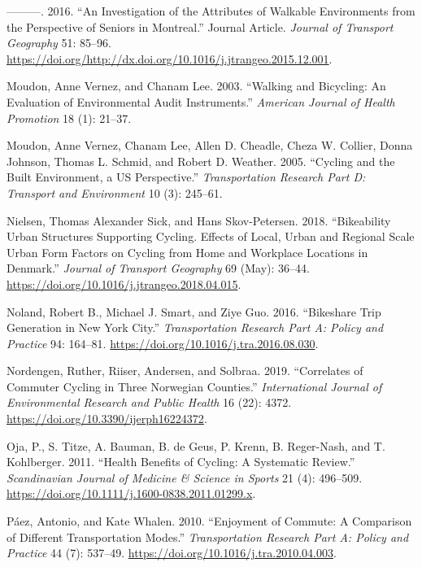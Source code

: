 \documentclass[smallextended]{svjour3}       %
\begin{document}
\leavevmode\hypertarget{ref-Moniruzzaman2016}{}%
---------. 2016. ``An Investigation of the Attributes of Walkable
Environments from the Perspective of Seniors in Montreal.'' Journal
Article. \emph{Journal of Transport Geography} 51: 85--96.
\url{https://doi.org/http://dx.doi.org/10.1016/j.jtrangeo.2015.12.001}.

\leavevmode\hypertarget{ref-Moudon2003walking}{}%
Moudon, Anne Vernez, and Chanam Lee. 2003. ``Walking and Bicycling: An
Evaluation of Environmental Audit Instruments.'' \emph{American Journal
of Health Promotion} 18 (1): 21--37.

\leavevmode\hypertarget{ref-moudonCyclingBuiltEnvironment2005a}{}%
Moudon, Anne Vernez, Chanam Lee, Allen D. Cheadle, Cheza W. Collier,
Donna Johnson, Thomas L. Schmid, and Robert D. Weather. 2005. ``Cycling
and the Built Environment, a US Perspective.'' \emph{Transportation
Research Part D: Transport and Environment} 10 (3): 245--61.

\leavevmode\hypertarget{ref-Nielsen2018}{}%
Nielsen, Thomas Alexander Sick, and Hans Skov-Petersen. 2018.
``Bikeability Urban Structures Supporting Cycling. Effects of Local,
Urban and Regional Scale Urban Form Factors on Cycling from Home and
Workplace Locations in Denmark.'' \emph{Journal of Transport Geography}
69 (May): 36--44. \url{https://doi.org/10.1016/j.jtrangeo.2018.04.015}.

\leavevmode\hypertarget{ref-nolandBikeshareTripGeneration2016}{}%
Noland, Robert B., Michael J. Smart, and Ziye Guo. 2016. ``Bikeshare
Trip Generation in New York City.'' \emph{Transportation Research Part
A: Policy and Practice} 94: 164--81.
\url{https://doi.org/10.1016/j.tra.2016.08.030}.

\leavevmode\hypertarget{ref-Nordengen2019}{}%
Nordengen, Ruther, Riiser, Andersen, and Solbraa. 2019. ``Correlates of
Commuter Cycling in Three Norwegian Counties.'' \emph{International
Journal of Environmental Research and Public Health} 16 (22): 4372.
\url{https://doi.org/10.3390/ijerph16224372}.

\leavevmode\hypertarget{ref-Oja2011}{}%
Oja, P., S. Titze, A. Bauman, B. de Geus, P. Krenn, B. Reger-Nash, and
T. Kohlberger. 2011. ``Health Benefits of Cycling: A Systematic
Review.'' \emph{Scandinavian Journal of Medicine \& Science in Sports}
21 (4): 496--509.
\url{https://doi.org/10.1111/j.1600-0838.2011.01299.x}.

\leavevmode\hypertarget{ref-paezEnjoymentCommuteComparison2010}{}%
Páez, Antonio, and Kate Whalen. 2010. ``Enjoyment of Commute: A
Comparison of Different Transportation Modes.'' \emph{Transportation
Research Part A: Policy and Practice} 44 (7): 537--49.
\url{https://doi.org/10.1016/j.tra.2010.04.003}.
\end{document}
